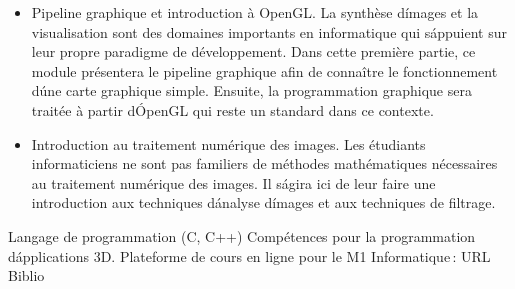 {
\begin{itemize}
\item Pipeline graphique et introduction à OpenGL. La synthèse d\'images et la visualisation sont des domaines importants en informatique qui s\'appuient sur leur propre paradigme de développement. Dans cette première partie, ce module présentera le pipeline graphique afin de connaître le fonctionnement d\'une carte graphique simple. Ensuite, la programmation graphique sera traitée à partir d\'OpenGL qui reste un standard dans ce contexte.
\item Introduction au traitement numérique des images. Les étudiants informaticiens ne sont pas familiers de méthodes mathématiques nécessaires au traitement numérique des images. Il s\'agira ici de leur faire une introduction aux techniques d\'analyse d\'images et aux techniques de filtrage.
\end{itemize}
} 
{Langage de programmation (C, C++)
} 
{Compétences pour la programmation d\'applications 3D.
} 
{Plateforme de cours en ligne pour le M1 Informatique\,: URL} 
{Biblio} 
 
\vfill
